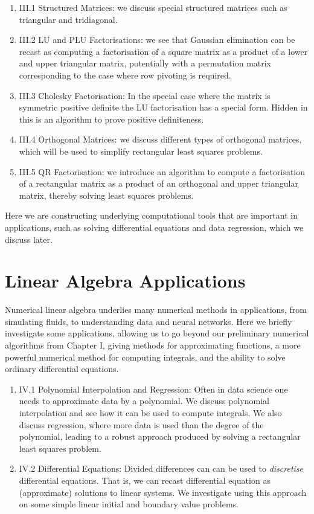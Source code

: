 \documentclass[12pt,a4paper]{book}
\theoremstyle{definition}
\begin{document}
\begin{enumerate}
    \item III.1 Structured Matrices: we discuss special structured matrices such as triangular and tridiagonal.
    \item III.2 LU and PLU Factorisations: we see that Gaussian elimination can be recast as computing a factorisation of a square matrix as a product of a lower and upper triangular matrix, potentially with a permutation matrix
    corresponding to the case where row pivoting is required.
    \item III.3 Cholesky Factorisation: In the special case where the matrix is symmetric positive
    definite the LU factorisation has a special form. Hidden in this is an algorithm to prove positive definiteness.
\item III.4 Orthogonal Matrices: we discuss different types of orthogonal matrices, which will be used to simplify rectangular least squares problems.
\item III.5 QR Factorisation: we introduce an algorithm to compute a factorisation of a rectangular matrix as a product of an orthogonal and upper triangular matrix, thereby solving least squares problems.
\end{enumerate}

Here we are constructing underlying computational tools that are important in applications, such as solving differential equations and data regression, which we discuss later.









\chapter{Linear Algebra Applications}

Numerical linear algebra underlies many numerical methods in applications, from simulating fluids, to understanding data
and  neural networks. Here we briefly investigate some applications, allowing us to go beyond our preliminary numerical algorithms from Chapter I,
giving methods for approximating functions, a more powerful numerical method for computing integrals, and the ability to solve ordinary differential equations.

\begin{enumerate}
\item IV.1 Polynomial Interpolation and Regression: Often in data science one needs to approximate data by a polynomial.
We discuss polynomial interpolation and see how it can be used to compute integrals. We also discuss regression, where more data is used than the degree of the polynomial,
leading to a robust approach  produced by solving a rectangular least squares problem.
\item IV.2 Differential Equations: Divided differences can can be used to {\it discretise} differential equations. That is, we can recast differential equation
as (approximate) solutions to linear systems.  We investigate using this approach on some simple linear initial and boundary value problems. 
\end{enumerate}
\end{document}
